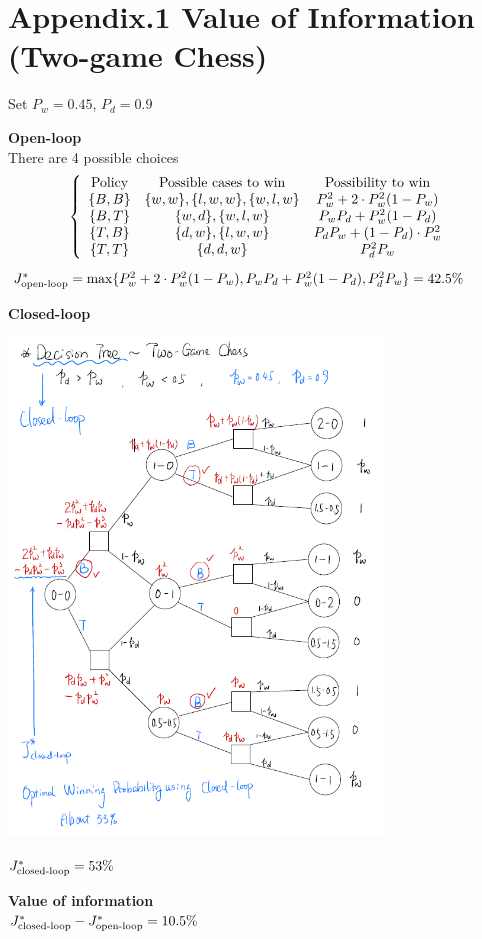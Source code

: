 \section{Appendix.1 Value of Information (Two-game Chess)}
Set $P_w = 0.45$, $P_d=0.9$

\textbf{Open-loop} \\
There are 4 possible choices
\[
    \left\{\begin{array}{ccc}
        \text{\rm Policy}   &   \text{Possible cases to win} &   \text{Possibility to win}   \\
        \{B,B\}             &   \{w,w\},\{l,w,w\},\{w,l,w\}  &   P_w^2+2\cdot P_w^2(1-P_w)   \\
        \{B,T\}             &   \{w,d\},\{w,l,w\}            &   P_w P_d+P_w^2(1-P_d)        \\
        \{T,B\}             &   \{d,w\},\{l,w,w\}            &   P_d P_w+(1-P_d)\cdot P_w^2  \\
        \{T,T\}             &   \{d,d,w\}                    &   P_d^2P_w  \\
    \end{array}\right.
\]
$ J^*_{\text{\rm open-loop}}=\max \{P_w^2+2\cdot P_w^2(1-P_w),P_w P_d+P_w^2(1-P_d),P_d^2P_w\} = 42.5\% $

\textbf{Closed-loop} \\
\centerline{\includegraphics[width=10cm]{Lecture1/Fig3.png}}
$ J^*_{\text{\rm closed-loop}}=53\%$

\textbf{Value of information} \\
$J^*_{\textbf{\rm closed-loop}} - J^*_{\textbf{\rm open-loop}} = 10.5\%$